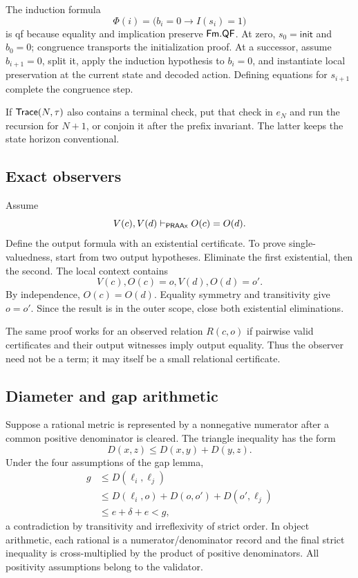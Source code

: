 The induction formula
\[
 \Phi(i)=\bigl(b_i=0\to I(s_i)=1\bigr)
\]
is qf because equality and implication preserve \(\mathsf{Fm}.\mathsf{QF}\).  At zero,
\(s_0=\mathsf{init}\) and \(b_0=0\); congruence transports the initialization
proof.  At a successor, assume \(b_{i+1}=0\), split it, apply the induction
hypothesis to \(b_i=0\), and instantiate local preservation at the current
state and decoded action.  Defining equations for \(s_{i+1}\) complete the
congruence step.

If \(\mathsf{Trace}(N,\tau)\) also contains a terminal check, put that check in
\(e_N\) and run the recursion for \(N+1\), or conjoin it after the prefix
invariant.  The latter keeps the state horizon conventional.

\subsection{Exact observers}

Assume
\[
 V(c),V(d)\mathrel{\vdash_{\mathsf{PRAAx}}} O(c)=O(d).
\]
Define the output formula with an existential certificate.  To prove
single-valuedness, start from two output hypotheses.  Eliminate the first
existential, then the second.  The local context contains
\[
 V(c), O(c)=o, V(d), O(d)=o'.
\]
By independence, \(O(c)=O(d)\).  Equality symmetry and transitivity give
\(o=o'\).  Since the result is in the outer scope, close both existential
eliminations.

The same proof works for an observed relation \(R(c,o)\) if pairwise valid
certificates and their output witnesses imply output equality.  Thus the
observer need not be a term; it may itself be a small relational certificate.

\subsection{Diameter and gap arithmetic}

Suppose a rational metric is represented by a nonnegative numerator after a
common positive denominator is cleared.  The triangle inequality has the
form
\[
 D(x,z)\le D(x,y)+D(y,z).
\]
Under the four assumptions of the gap lemma,
\[
\begin{aligned}
 g&\le D(\ell_i,\ell_j)\\
  &\le D(\ell_i,o)+D(o,o')+D(o',\ell_j)\\
  &\le e+\delta+e<g,
\end{aligned}
\]
a contradiction by transitivity and irreflexivity of strict order.  In object
arithmetic, each rational is a numerator/denominator record and the final
strict inequality is cross-multiplied by the product of positive denominators.
All positivity assumptions belong to the validator.

